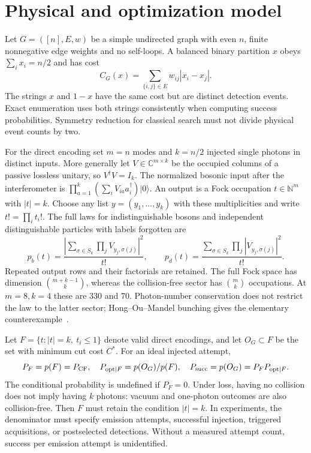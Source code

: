 \section{Physical and optimization model}\label{sec:model}
Let $G=([n],E,w)$ be a simple undirected graph with even $n$, finite nonnegative edge weights and no self-loops. A balanced binary partition $x$ obeys $\sum_i x_i=n/2$ and has cost
\begin{equation}
 C_G(x)=\sum_{\{i,j\}\in E}w_{ij}|x_i-x_j|.\label{eq:cut}
\end{equation}
The strings $x$ and $1-x$ have the same cost but are distinct detection events. Exact enumeration uses both strings consistently when computing success probabilities. Symmetry reduction for classical search must not divide physical event counts by two.

For the direct encoding set $m=n$ modes and $k=n/2$ injected single photons in distinct inputs. More generally let $V\in\mathbb C^{m\times k}$ be the occupied columns of a passive lossless unitary, so $V^\dagger V=I_k$. The normalized bosonic input after the interferometer is $\prod_{a=1}^k(\sum_iV_{ia}a_i^\dagger)|0\rangle$. An output is a Fock occupation $t\in\mathbb N^m$ with $|t|=k$. Choose any list $y=(y_1,\ldots,y_k)$ with these multiplicities and write $t!=\prod_i t_i!$. The full laws for indistinguishable bosons and independent distinguishable particles with labels forgotten are
\begin{equation}
 p_b(t)=\frac{\left|\sum_{\sigma\in S_k}\prod_jV_{y_j,\sigma(j)}\right|^2}{t!},\qquad
 p_d(t)=\frac{\sum_{\sigma\in S_k}\prod_j|V_{y_j,\sigma(j)}|^2}{t!}.\label{eq:laws}
\end{equation}
Repeated output rows and their factorials are retained. The full Fock space has dimension $\binom{m+k-1}{k}$, whereas the collision-free sector has $\binom{m}{k}$ occupations. At $m=8,k=4$ these are $330$ and $70$. Photon-number conservation does not restrict the law to the latter sector; Hong--Ou--Mandel bunching gives the elementary counterexample~\cite{hom1987}.

Let $F=\{t:|t|=k,\ t_i\le1\}$ denote valid direct encodings, and let $O_G\subset F$ be the set with minimum cut cost $C^*$. For an ideal injected attempt,
\begin{equation}
 P_F=p(F)=P_{\mathrm{CF}},\quad P_{\mathrm{opt}\mid F}=p(O_G)/p(F),\quad
 P_{\mathrm{succ}}=p(O_G)=P_F P_{\mathrm{opt}\mid F}.\label{eq:success}
\end{equation}
The conditional probability is undefined if $P_F=0$. Under loss, having no collision does not imply having $k$ photons: vacuum and one-photon outcomes are also collision-free. Then $F$ must retain the condition $|t|=k$. In experiments, the denominator must specify emission attempts, successful injection, triggered acquisitions, or postselected detections. Without a measured attempt count, success per emission attempt is unidentified.

